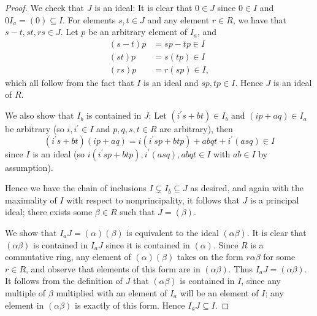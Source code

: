 \documentclass[11pt]{article}
\begin{document}
\begin{enumerate}
\begin{enumerate}
\begin{proof}
            We check that $J$ is an ideal: It is clear that $0\in J$ since $0\in I$ and $0I_a = (0)\subseteq I$. For elements $s,t\in J$ and any element $r\in R$, we have that $s-t,st,rs\in J$. Let $p$ be an arbitrary element of $I_a$, and \begin{align*}
                (s-t)p &= sp- tp\in I \\
                (st)p &= s(tp) \in I\\
                (rs)p &= r(sp) \in I,
            \end{align*} which all follow from the fact that $I$ is an ideal and $sp, tp\in I$. Hence $J$ is an ideal of $R$.
            
            We also show that $I_b$ is contained in $J$: Let $(i^{\prime}s+bt)\in I_b$ and $(ip+aq)\in I_a$ be arbitrary (so $i,i^{\prime}\in I$ and $p,q,s,t\in R$ are arbitrary), then \[(i^{\prime}s+bt)(ip+aq) = i(i^{\prime}sp + btp) + abqt + i^{\prime}(asq) \in I\] since $I$ is an ideal (so $i(i^{\prime}sp + btp),i^{\prime}(asq), abqt \in I$ with $ab\in I$ by assumption). 

            Hence we have the chain of inclusions $I\subsetneq I_b\subseteq J$ as desired, and again with the maximality of $I$ with respect to nonprincipality, it follows that $J$ is a principal ideal; there exists some $\beta\in R$ such that $J = (\beta)$.
            
            We show that $I_aJ = (\alpha)(\beta)$ is equivalent to the ideal $(\alpha\beta)$. It is clear that $(\alpha\beta)$ is contained in $I_aJ$ since it is contained in $(\alpha)$. Since $R$ is a commutative ring, any element of $(\alpha)(\beta)$ takes on the form $r\alpha\beta$ for some $r\in R$, and observe that elements of this form are in $(\alpha\beta)$. Thus $I_aJ = (\alpha\beta)$. It follows from the definition of $J$ that $(\alpha\beta)$ is contained in $I$, since any multiple of $\beta$ multiplied with an element of $I_a$ will be an element of $I$; any element in $(\alpha\beta)$ is exactly of this form. Hence $I_aJ\subseteq I$.


\end{proof}
\end{enumerate}
\end{enumerate}
\end{document}
